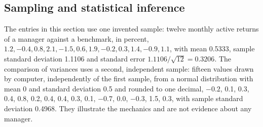 \subsection{Sampling and statistical inference}

The entries in this section use one invented sample: twelve monthly active returns of a manager against a benchmark, in percent, $1.2, -0.4, 0.8, 2.1, -1.5, 0.6, 1.9, -0.2, 0.3, 1.4, -0.9, 1.1$, with mean 0.5333, sample standard deviation 1.1106 and standard error $1.1106/\sqrt{12}=0.3206$. The comparison of variances uses a second, independent sample: fifteen values drawn by computer, independently of the first sample, from a normal distribution with mean 0 and standard deviation 0.5 and rounded to one decimal, $-0.2$, 0.1, 0.3, 0.4, 0.8, 0.2, 0.4, 0.4, 0.3, 0.1, $-0.7$, 0.0, $-0.3$, 1.5, 0.3, with sample standard deviation 0.4968. They illustrate the mechanics and are not evidence about any manager.

